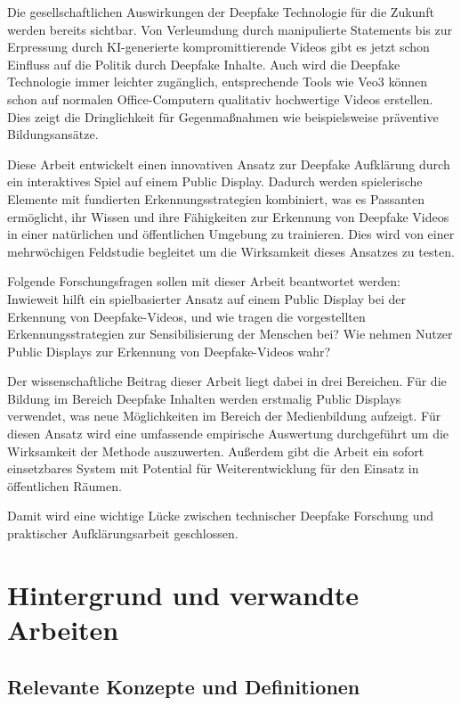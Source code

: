Die gesellschaftlichen Auswirkungen der Deepfake Technologie für die Zukunft werden bereits sichtbar. 
Von Verleumdung durch manipulierte Statements bis zur Erpressung durch KI-generierte kompromittierende Videos\cite{PDFImpactDeepfake2025} gibt es jetzt schon Einfluss auf die Politik durch Deepfake Inhalte. 
Auch wird die Deepfake Technologie immer leichter zugänglich, 
entsprechende Tools wie Veo3 können schon auf normalen Office-Computern qualitativ hochwertige Videos erstellen. 
Dies zeigt die Dringlichkeit für Gegenmaßnahmen wie beispielsweise präventive Bildungsansätze.

Diese Arbeit entwickelt einen innovativen Ansatz zur Deepfake Aufklärung durch ein interaktives Spiel auf einem Public Display. 
Dadurch werden spielerische Elemente mit fundierten Erkennungsstrategien kombiniert, was es Passanten ermöglicht, 
ihr Wissen und ihre Fähigkeiten zur Erkennung von Deepfake Videos in einer natürlichen und öffentlichen Umgebung zu trainieren. 
Dies wird von einer mehrwöchigen Feldstudie begleitet um die Wirksamkeit dieses Ansatzes zu testen.

Folgende Forschungsfragen sollen mit dieser Arbeit beantwortet werden: 
Inwieweit hilft ein spielbasierter Ansatz auf einem Public Display bei der Erkennung von Deepfake-Videos, 
und wie tragen die vorgestellten Erkennungsstrategien zur Sensibilisierung der Menschen bei?
Wie nehmen Nutzer Public Displays zur Erkennung von Deepfake-Videos wahr?

Der wissenschaftliche Beitrag dieser Arbeit liegt dabei in drei Bereichen. 
Für die Bildung im Bereich Deepfake Inhalten werden erstmalig Public Displays verwendet, was neue Möglichkeiten im Bereich der Medienbildung aufzeigt. 
Für diesen Ansatz wird eine umfassende empirische Auswertung durchgeführt um die Wirksamkeit der Methode auszuwerten.
 Außerdem gibt die Arbeit ein sofort einsetzbares System mit Potential für Weiterentwicklung für den Einsatz in öffentlichen Räumen.

Damit wird eine wichtige Lücke zwischen technischer Deepfake Forschung und praktischer Aufklärungsarbeit geschlossen.

\chapter{Hintergrund und verwandte Arbeiten}
\section{Relevante Konzepte und Definitionen}

